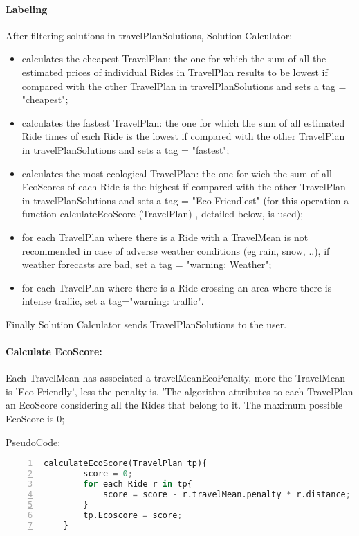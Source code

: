 	\paragraph{Labeling}
		\mbox{}\newline 
		After filtering solutions in travelPlanSolutions, Solution Calculator:\newline
	\begin{itemize}

		
	
		\item calculates the cheapest  TravelPlan: the one for which the sum of all the estimated prices of individual Rides in TravelPlan results to be lowest if compared with the other TravelPlan in travelPlanSolutions  and sets a tag = "cheapest";
	
		\item calculates the fastest TravelPlan: the one for which the sum of all estimated Ride times of each Ride is the lowest if compared with the other TravelPlan in travelPlanSolutions and sets a tag = "fastest"; 
		
		\item calculates the most ecological TravelPlan: the one for wich  the sum of all EcoScores of each Ride is  the highest if compared with the other TravelPlan in travelPlanSolutions and sets a tag = "Eco-Friendlest" (for this operation a function calculateEcoScore (TravelPlan) , detailed below, is used);
	
		\item for each TravelPlan where there is a Ride with a TravelMean is not recommended in case of adverse weather conditions (eg rain, snow, ..), if weather forecasts are bad, set a tag = "warning: Weather";\newline
	
		\item for each TravelPlan where there is a Ride crossing an area where there is intense traffic, set a tag="warning: traffic". 
		\end{itemize}
	
		Finally Solution Calculator sends TravelPlanSolutions to the user.\newline
	
	
	\paragraph{Calculate EcoScore:}	
	\mbox{} \newline
		Each TravelMean has associated a travelMeanEcoPenalty, more the TravelMean is 'Eco-Friendly', less the penalty is. 'The algorithm attributes to each TravelPlan an EcoScore considering all the Rides that belong to it.
		The maximum possible EcoScore is 0; \newline
	
	PseudoCode: \newline
	\begin{lstlisting}[language=python, numbers=left]
	calculateEcoScore(TravelPlan tp){
		score = 0;
		for each Ride r in tp{
			score = score - r.travelMean.penalty * r.distance;
		}
		tp.Ecoscore = score;
	}
	\end{lstlisting}
